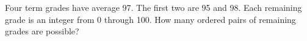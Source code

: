 Four term grades have average 97. The first two are 95 and 98. Each remaining grade is an integer from 0 through 100. How many ordered pairs of remaining grades are possible?
